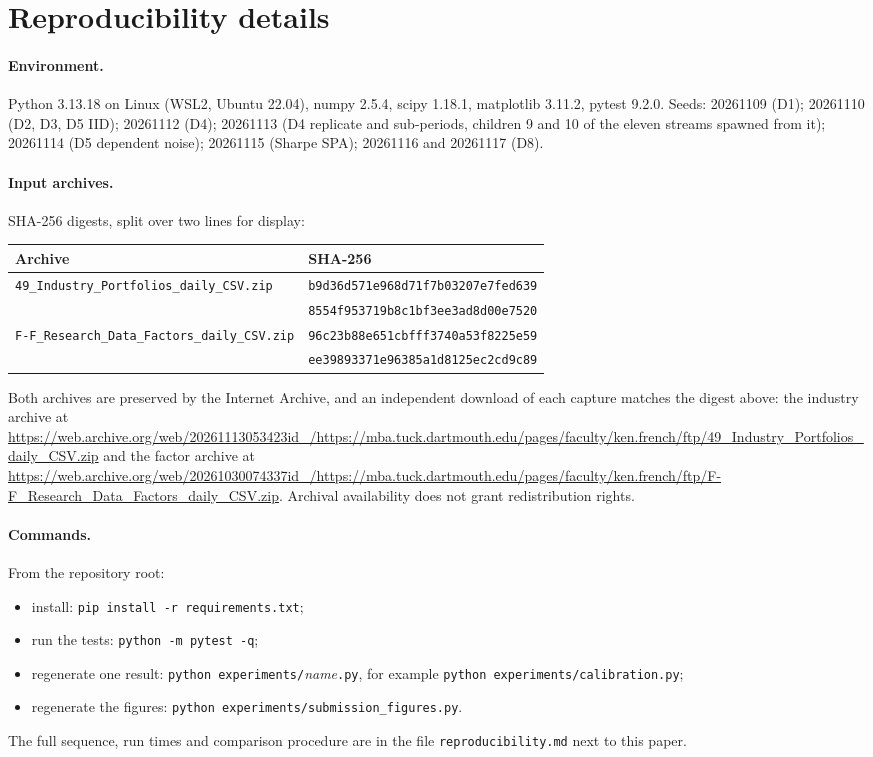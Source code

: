 \documentclass[11pt,a4paper]{article}
\begin{document}
\FloatBarrier
\section{Reproducibility details}\label{app:repro}

\paragraph{Environment.} Python 3.13.18 on Linux (WSL2, Ubuntu 22.04), numpy 2.5.4, scipy 1.18.1, matplotlib 3.11.2, pytest 9.2.0. Seeds: 20261109 (D1); 20261110 (D2, D3, D5 IID); 20261112 (D4); 20261113 (D4 replicate and sub-periods, children 9 and 10 of the eleven streams spawned from it); 20261114 (D5 dependent noise); 20261115 (Sharpe SPA); 20261116 and 20261117 (D8).

\paragraph{Input archives.} SHA-256 digests, split over two lines for display:
\begin{center}\scriptsize
\begin{tabular}{@{}ll@{}}
\toprule
Archive & SHA-256 \\
\midrule
\texttt{49\_Industry\_Portfolios\_daily\_CSV.zip} & \texttt{b9d36d571e968d71f7b03207e7fed639} \\
 & \texttt{8554f953719b8c1bf3ee3ad8d00e7520} \\
\texttt{F-F\_Research\_Data\_Factors\_daily\_CSV.zip} & \texttt{96c23b88e651cbfff3740a53f8225e59} \\
 & \texttt{ee39893371e96385a1d8125ec2cd9c89} \\
\bottomrule
\end{tabular}
\end{center}
Both archives are preserved by the Internet Archive, and an independent download of each capture matches the digest above: the industry archive at \url{https://web.archive.org/web/20261113053423id_/https://mba.tuck.dartmouth.edu/pages/faculty/ken.french/ftp/49_Industry_Portfolios_daily_CSV.zip} and the factor archive at \url{https://web.archive.org/web/20261030074337id_/https://mba.tuck.dartmouth.edu/pages/faculty/ken.french/ftp/F-F_Research_Data_Factors_daily_CSV.zip}. Archival availability does not grant redistribution rights.

\paragraph{Commands.} From the repository root:
\begin{itemize}\raggedright
\item install: \texttt{pip install -r requirements.txt};
\item run the tests: \texttt{python -m pytest -q};
\item regenerate one result: \texttt{python experiments/}\textit{name}\texttt{.py}, for example \texttt{python experiments/calibration.py};
\item regenerate the figures: \texttt{python experiments/submission\_figures.py}.
\end{itemize}
The full sequence, run times and comparison procedure are in the file \texttt{reproducibility.md} next to this paper.
\end{document}
